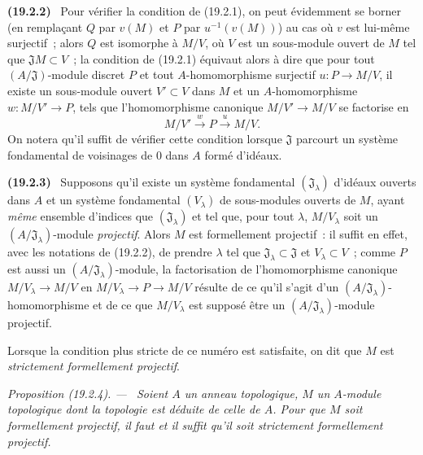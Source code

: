 \documentclass[10pt,oneside]{book}
\makeatletter
\newcommand{\setmanualcurrentlabel}[1]{\def\@currentlabel{#1}}
\newcommand{\oldpage}[2][]{%
  \setcounter{footnote}{0}%
  \marginpar{\scriptsize\textbf{#1}~|~#2}\ignorespaces}
\newenvironment{env}[1][]{\setmanualcurrentlabel{#1}\par\medskip\noindent\textbf{(#1)}\ }{\par}
\newenvironment{proposition}[1][]{%
  \setmanualcurrentlabel{#1}\par\medskip\noindent\itshape Proposition (#1). ---\ }{\par}
\makeatother
\begin{document}
\begin{env}[19.2.2]
\label{0.19.2.2-fr}
Pour vérifier la condition de (19.2.1), on peut évidemment se borner (en
remplaçant $Q$ par $v(M)$ et $P$ par $u^{-1}(v(M))$) au cas où $v$ est
lui-même surjectif~; alors $Q$ est isomorphe à $M/V$, où $V$ est un
sous-module ouvert de $M$ tel que $\mathfrak JM\subset V$~; la condition de
(19.2.1) équivaut alors à dire que pour tout $(A/\mathfrak J)$-module discret
$P$ et tout $A$-homomorphisme surjectif $u:P\to M/V$, il existe un sous-module
ouvert $V'\subset V$ dans $M$ et un $A$-homomorphisme $w:M/V'\to P$, tels que
l'homomorphisme canonique $M/V'\to M/V$ se factorise en
\[
  M/V'\xrightarrow{w}P\xrightarrow{u}M/V.
\]
On notera qu'il suffit de vérifier cette condition lorsque $\mathfrak J$
parcourt un système fondamental de voisinages de 0 dans $A$ formé d'idéaux.
\end{env}

\begin{env}[19.2.3]
\label{0.19.2.3-fr}
Supposons qu'il existe un système fondamental $(\mathfrak J_\lambda)$ d'idéaux
ouverts dans $A$ et un système fondamental $(V_\lambda)$ de sous-modules
ouverts de $M$, ayant \emph{même} ensemble d'indices que
$(\mathfrak J_\lambda)$ et tel que, pour tout $\lambda$, $M/V_\lambda$ soit un
$(A/\mathfrak J_\lambda)$-module \emph{projectif}. Alors $M$ est formellement
projectif~: il suffit en effet, avec les notations de (19.2.2), de prendre
$\lambda$ tel que $\mathfrak J_\lambda\subset\mathfrak J$ et
$V_\lambda\subset V$~; comme $P$ est aussi un
$(A/\mathfrak J_\lambda)$-module, la factorisation de l'homomorphisme canonique
$M/V_\lambda\to M/V$ en $M/V_\lambda\to P\to M/V$ résulte de ce qu'il s'agit
d'un $(A/\mathfrak J_\lambda)$-homomorphisme et de ce que $M/V_\lambda$ est
supposé être un $(A/\mathfrak J_\lambda)$-module projectif.

Lorsque la condition plus stricte de ce numéro est satisfaite, on dit que $M$
est \emph{strictement formellement projectif}.
\end{env}

\begin{proposition}[19.2.4]
\label{0.19.2.4-fr}
Soient $A$ un anneau topologique, $M$ un $A$-module topologique dont la
topologie est déduite de celle de $A$. Pour que $M$ soit formellement
projectif, il faut et il suffit qu'il soit strictement formellement projectif.
\end{proposition}

\oldpage[0\textsubscript{IV-1}]{79}
\end{document}

